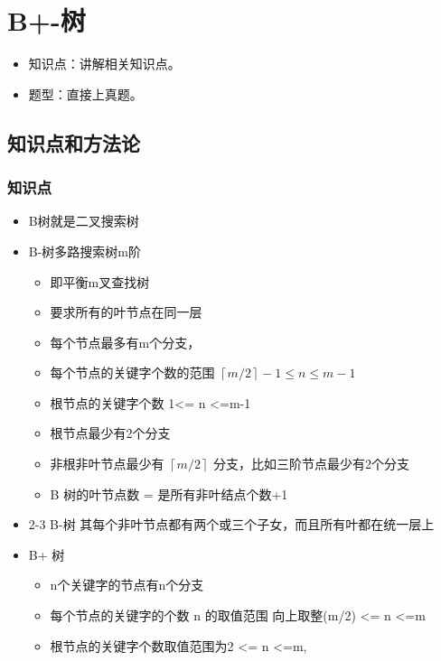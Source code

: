 \chapter{B+-树}
\label{chap6}
\begin{itemize}[noitemsep,topsep=0pt,parsep=0pt,partopsep=0pt]
	\item 知识点：讲解相关知识点。
	\item 题型：直接上真题。
\end{itemize}

\section{知识点和方法论}

\subsection{知识点}
\begin{itemize}[noitemsep,topsep=0pt,parsep=0pt,partopsep=0pt]
	\item B树就是二叉搜索树
	\item B-树多路搜索树m阶
	\begin{itemize}[noitemsep,topsep=0pt,parsep=0pt,partopsep=0pt]
			\item 即平衡m叉查找树
			\item 要求所有的叶节点在同一层
			\item 每个节点最多有m个分支，
			\item 每个节点的关键字个数的范围 $\left \lceil m/2 \right \rceil -1  \le n \le m-1 $
			\item 根节点的关键字个数     1<= n <=m-1 
			\item 根节点最少有2个分支
			\item 非根非叶节点最少有 $\left \lceil m/2 \right \rceil$  分支，比如三阶节点最少有2个分支
			\item B 树的叶节点数 = 是所有非叶结点个数+1
	\end{itemize}
	\item 2-3 B-树 其每个非叶节点都有两个或三个子女，而且所有叶都在统一层上
	\item B+ 树
	\begin{itemize}[noitemsep,topsep=0pt,parsep=0pt,partopsep=0pt]
		\item n个关键字的节点有n个分支
		\item 每个节点的关键字的个数 n 的取值范围    向上取整(m/2) <= n <=m
        \item 根节点的关键字个数取值范围为2 <= n <=m,
	\end{itemize}
\end{itemize}
